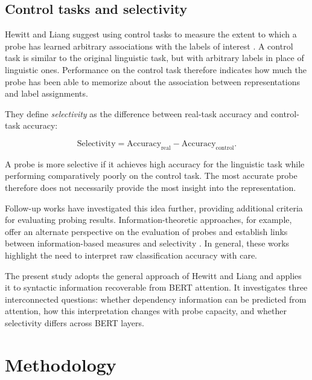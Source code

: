 \documentclass[12pt,a4paper]{article}
\begin{document}
\subsection{Control tasks and selectivity}

Hewitt and Liang suggest using control tasks to measure the extent to which a probe has learned arbitrary associations with the labels of interest \cite{hewitt2019designing}. A control task is similar to the original linguistic task, but with arbitrary labels in place of linguistic ones. Performance on the control task therefore indicates how much the probe has been able to memorize about the association between representations and label assignments.

They define \emph{selectivity} as the difference between real-task accuracy and control-task accuracy:

\begin{equation}
\text{Selectivity}
=
\text{Accuracy}_{\text{real}}
-
\text{Accuracy}_{\text{control}}.
\end{equation}

A probe is more selective if it achieves high accuracy for the linguistic task while performing comparatively poorly on the control task. The most accurate probe therefore does not necessarily provide the most insight into the representation.

Follow-up works have investigated this idea further, providing additional criteria for evaluating probing results. Information-theoretic approaches, for example, offer an alternate perspective on the evaluation of probes and establish links between information-based measures and selectivity \cite{zhu2020information}. In general, these works highlight the need to interpret raw classification accuracy with care.

The present study adopts the general approach of Hewitt and Liang and applies it to syntactic information recoverable from BERT attention. It investigates three interconnected questions: whether dependency information can be predicted from attention, how this interpretation changes with probe capacity, and whether selectivity differs across BERT layers.





\section{Methodology}
\end{document}
